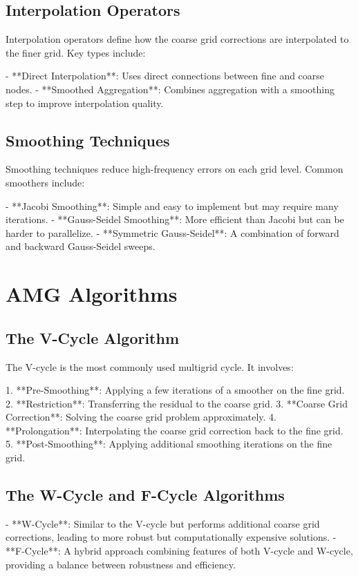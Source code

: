 \subsection{Interpolation Operators}

Interpolation operators define how the coarse grid corrections are interpolated to the finer grid. Key types include:

- **Direct Interpolation**: Uses direct connections between fine and coarse nodes.
- **Smoothed Aggregation**: Combines aggregation with a smoothing step to improve interpolation quality.

\subsection{Smoothing Techniques}

Smoothing techniques reduce high-frequency errors on each grid level. Common smoothers include:

- **Jacobi Smoothing**: Simple and easy to implement but may require many iterations.
- **Gauss-Seidel Smoothing**: More efficient than Jacobi but can be harder to parallelize.
- **Symmetric Gauss-Seidel**: A combination of forward and backward Gauss-Seidel sweeps.

\section{AMG Algorithms}

\subsection{The V-Cycle Algorithm}

The V-cycle is the most commonly used multigrid cycle. It involves:

1. **Pre-Smoothing**: Applying a few iterations of a smoother on the fine grid.
2. **Restriction**: Transferring the residual to the coarse grid.
3. **Coarse Grid Correction**: Solving the coarse grid problem approximately.
4. **Prolongation**: Interpolating the coarse grid correction back to the fine grid.
5. **Post-Smoothing**: Applying additional smoothing iterations on the fine grid.

\subsection{The W-Cycle and F-Cycle Algorithms}

- **W-Cycle**: Similar to the V-cycle but performs additional coarse grid corrections, leading to more robust but computationally expensive solutions.
- **F-Cycle**: A hybrid approach combining features of both V-cycle and W-cycle, providing a balance between robustness and efficiency.


